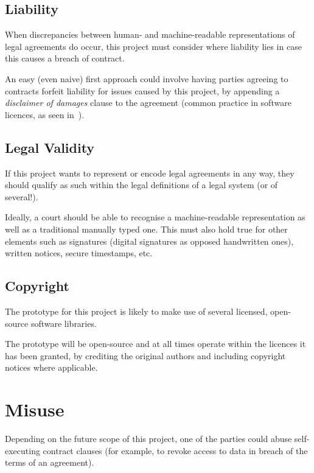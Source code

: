 \subsection{Liability}\label{subsec:liability}

When discrepancies between human- and machine-readable representations of legal agreements do occur,
this project must consider where liability lies in case this causes a breach of contract.

An easy (even naive) first approach could involve having parties agreeing to contracts forfeit
liability for issues caused by this project, by appending a \textit{disclaimer of damages} clause to
the agreement (common practice in software licences, as seen
in~\cite[]{jetbrainsToolbox}).


\subsection{Legal Validity}\label{subsec:legal-validity}

If this project wants to represent or encode legal agreements in any way, they should qualify as
such within the legal definitions of a legal system (or of several!).

Ideally, a court should be able to recognise a machine-readable representation as well as a
traditional manually typed one.
This must also hold true for other elements such as signatures (digital signatures as opposed
handwritten ones), written notices, secure timestamps, etc.

\subsection{Copyright}\label{subsec:copyright}

The prototype for this project is likely to make use of several licensed, open-source software
libraries.

The prototype will be open-source and at all times operate within the licences it has been granted,
by crediting the original authors and including copyright notices where applicable.

\section{Misuse}\label{sec:misuse}

Depending on the future scope of this project, one of the parties could abuse self-executing
contract clauses (for example, to revoke access to data in breach of the terms of an agreement).

